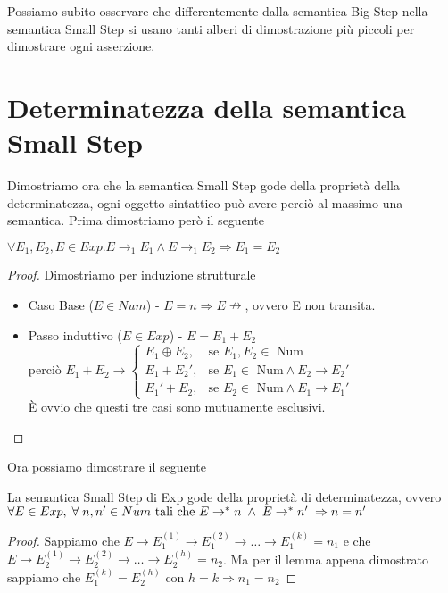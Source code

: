 Possiamo subito osservare che differentemente dalla semantica Big Step
nella semantica Small Step si usano tanti alberi di dimostrazione più piccoli per dimostrare
ogni asserzione. 

\section{Determinatezza della semantica Small Step} 
Dimostriamo ora che la semantica Small Step gode della proprietà
della determinatezza, ogni oggetto sintattico può avere perciò
al massimo una semantica. Prima dimostriamo però il seguente

\begin{teorema}
$\forall E_1, E_2, E \in Exp . E \rightarrow _1 E_1 \land E \rightarrow _1 E_2 \Rightarrow E_1 = E_2 $
\end{teorema}

\begin{proof}
  Dimostriamo per induzione strutturale
  \begin{itemize}
  \item Caso Base ($E \in Num$) - $E = n \Rightarrow E \nrightarrow$, ovvero E non transita.
  \item Passo induttivo ($E \in Exp$) - $E = E_1 + E_2$ \\
    perciò $E_1 + E_2 \rightarrow \begin{cases} E_1 \oplus E_2, & \mbox{se }E_1, E_2 \in \mbox{ Num} \\
    E_1 + E_2', & \mbox{se }E_1 \in \mbox{ Num} \land E_2 \rightarrow E_2' \\
    E_1' + E_2, & \mbox{se }E_2 \in \mbox{ Num} \land E_1 \rightarrow E_1' \end{cases}$\\
    È ovvio che questi tre casi sono mutuamente esclusivi.
  \end{itemize}
\end{proof}

Ora possiamo dimostrare il seguente

\begin{teorema}[Determinatezza]
La semantica Small Step di Exp gode della proprietà di determinatezza, ovvero
$\forall E \in Exp, \; \forall \; n, n' \in Num \text{ tali che }\\
 E\rightarrow ^* n \; \land \; E \rightarrow ^* n' \; \Rightarrow n = n'$
\end{teorema}

\begin{proof}
  Sappiamo che $E \rightarrow E_1^{(1)} \rightarrow E_1^{(2)} \rightarrow \dots \rightarrow E_1^{(k)} = n_1$ e che 
  $E \rightarrow E_2^{(1)} \rightarrow E_2^{(2)} \rightarrow \dots \rightarrow E_2^{(h)} = n_2$.
  Ma per il lemma appena dimostrato sappiamo che $E_1^{(k)} = E_2^{(h)} \text{ con } h = k \Rightarrow n_1 = n_2$
\end{proof}

